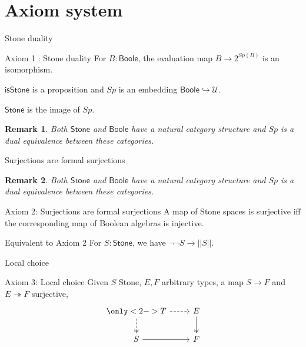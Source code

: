 \documentclass{beamer}
\newcommand{\Type}{\mathcal U}
\newcommand{\Boole}{\mathsf{Boole}}
\newcommand{\Stone}{\mathsf{Stone}}
\newcommand{\isSt}{\mathsf{isStone}}
\newtheorem{remark}{Remark}
\begin{document}
\section{Axiom system}
\begin{frame}{Stone duality}
  \begin{block}{Axiom 1 : Stone duality}
    For $B:\Boole$, the evaluation map $B \to 2^{Sp(B)}$ is an isomorphism. 
  \end{block}
  \pause
  \begin{corollary}
    $\isSt$ is a proposition and 
    $Sp$ is an embedding $\Boole \hookrightarrow \Type$. 
  \end{corollary}
  \pause
  \begin{definition}
    $\Stone$ is the image of $Sp$. 
  \end{definition}
  \pause
  \begin{remark}
    Both $\Stone$ and $\Boole$ have a natural category structure and $Sp$
    is a dual equivalence between these categories. 
  \end{remark}
\end{frame}
\begin{frame}{Surjections are formal surjections}
  \begin{remark}
    Both $\Stone$ and $\Boole$ have a natural category structure and $Sp$
    is a dual equivalence between these categories. 
  \end{remark}
  \pause
  \begin{block}{Axiom 2: Surjections are formal surjections}
    A map of Stone spaces is surjective iff the corresponding map of Boolean algebras is injective. 
  \end{block}
  \pause
  \begin{block}{Equivalent to Axiom 2}
    For $S:\Stone$, we have $\neg \neg S \to || S||$. 
  \end{block}
\end{frame}
\begin{frame}[fragile]{Local choice}
  \begin{block}{Axiom 3: Local choice}
  Given $S$ Stone, $E,F$ arbitrary types, a map $S \to F$ and 
  $E\twoheadrightarrow F$ surjective, 
   \begin{equation*}\begin{tikzcd}
      \only<2->{
      T \arrow [d, two heads,dashed] \arrow [r,dashed]
      } 
    & E \arrow[d,""',two heads]\\
      S \arrow[r] & F
    \end{tikzcd}\end{equation*}  
  \end{block}
\end{frame}
\end{document}
